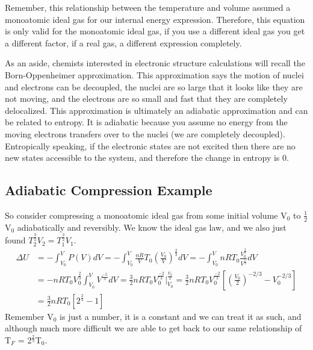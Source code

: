 \documentclass{article}
\begin{document}
Remember, this relationship between the temperature and volume assumed a monoatomic ideal gas for our internal energy expression.
Therefore, this equation is only valid for the monoatomic ideal gas, if you use a different ideal gas you get a different factor, if a real gas, a different expression completely. 

As an aside, chemists interested in electronic structure calculations will recall the Born-Oppenheimer approximation.
This approximation says the motion of nuclei and electrons can be decoupled, the nuclei are so large that it looks like they are not moving, and the electrons are so small and fast that they are completely delocalized.
This approximation is ultimately an adiabatic approximation and can be related to entropy.
It is adiabatic because you assume no energy from the moving electrons transfers over to the nuclei (we are completely decoupled).
Entropically speaking, if the electronic states are not excited then there are no new states accessible to the system, and therefore the change in entropy is 0. 
 
\subsection*{Adiabatic Compression Example}
So consider compressing a monoatomic ideal gas from some initial volume V$_0$ to $\frac{1}{2}$V$_0$ adiabatically and reversibly. 
We know the ideal gas law, and we also just found $ T_2^{\frac{3}{2}}V_2 = T_1^{\frac{3}{2}}V_1$. 
\begin{equation}
\begin{split}
    \Delta U &= -\int_{V_0}^V P(V)dV =  -\int_{V_0}^V \frac{nR}{V}T_0\left( \frac{V_0}{V} \right)^{\frac{2}{3}} dV = -\int_{V_0}^V nRT_0 \frac{V_0^{\frac{2}{3}}}{V^{\frac{5}{3}}}  dV \\
    &= -nRT_0V_0^{\frac{2}{3}}\int_{V_0}^V V^{\frac{-5}{3}}dV = \frac{3}{2}nRT_0 V_0^{\frac{-2}{3}}\Big|_{V_0}^{\frac{V_0}{2}} = \frac{3}{2}nRT_0 V_0^{\frac{-2}{3}} \left [\left ( \frac{V_0}{2} \right)^{-2/3} - V_0^{-2/3}\right] \\
    &= \frac{3}{2}nRT_0\left[ 2^{\frac{2}{3}} - 1 \right]
    \end{split}
\end{equation}
Remember V$_0$ is just a number, it is a constant and we can treat it as such, and although much more difficult we are able to get back to our same relationship of T$_F$ = 2$^{\frac{2}{3}}$T$_0$. 
\end{document}

